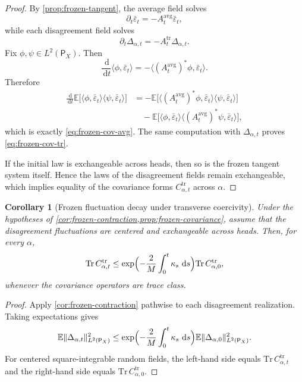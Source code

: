 \documentclass[11pt]{article}
\newtheorem{corollary}[theorem]{Corollary}
\theoremstyle{definition}
\newcommand{\E}{\mathbb{E}}
\newcommand{\dd}{\,\mathrm{d}}
\begin{document}
\begin{proof}
By \cref{prop:frozen-tangent}, the average field solves
\[
  \partial_t \bar\varepsilon_t = -A_t^{\mathrm{avg}}\bar\varepsilon_t,
\]
while each disagreement field solves
\[
  \partial_t \Delta_{\alpha,t} = -A_t^{\mathrm{tr}}\Delta_{\alpha,t}.
\]
Fix $\phi,\psi\in L^2(\mathsf P_X)$.
Then
\[
  \frac{\dd}{\dd t}\langle \phi,\bar\varepsilon_t\rangle
  =
  -\langle (A_t^{\mathrm{avg}})^*\phi,\bar\varepsilon_t\rangle.
\]
Therefore
\begin{align*}
  \frac{\dd}{\dd t}
  \E\bigl[\langle \phi,\bar\varepsilon_t\rangle \langle \psi,\bar\varepsilon_t\rangle\bigr]
  &=
  -\E\bigl[\langle (A_t^{\mathrm{avg}})^*\phi,\bar\varepsilon_t\rangle \langle \psi,\bar\varepsilon_t\rangle\bigr]
  \\
  &\quad
  -
  \E\bigl[\langle \phi,\bar\varepsilon_t\rangle \langle (A_t^{\mathrm{avg}})^*\psi,\bar\varepsilon_t\rangle\bigr],
\end{align*}
which is exactly \eqref{eq:frozen-cov-avg}.
The same computation with $\Delta_{\alpha,t}$ proves \eqref{eq:frozen-cov-tr}.

If the initial law is exchangeable across heads, then so is the frozen tangent system itself.
Hence the laws of the disagreement fields remain exchangeable, which implies equality of the covariance forms $C_{\alpha,t}^{\mathrm{tr}}$ across $\alpha$.
\end{proof}

\begin{corollary}[Frozen fluctuation decay under transverse coercivity]
\label{cor:frozen-fluctuation-decay}
Under the hypotheses of \cref{cor:frozen-contraction,prop:frozen-covariance},
assume that the disagreement fluctuations are centered and exchangeable across heads.
Then, for every $\alpha$,
\begin{equation}
  \mathrm{Tr}\, C_{\alpha,t}^{\mathrm{tr}}
  \le
  \exp\Bigl(
    -\frac{2}{M}\int_0^t \kappa_s\,\dd s
  \Bigr)
  \mathrm{Tr}\, C_{\alpha,0}^{\mathrm{tr}},
  \label{eq:frozen-fluctuation-trace}
\end{equation}
whenever the covariance operators are trace class.
\end{corollary}

\begin{proof}
Apply \cref{cor:frozen-contraction} pathwise to each disagreement realization.
Taking expectations gives
\[
  \E\|\Delta_{\alpha,t}\|_{L^2(\mathsf P_X)}^2
  \le
  \exp\Bigl(
    -\frac{2}{M}\int_0^t \kappa_s\,\dd s
  \Bigr)
  \E\|\Delta_{\alpha,0}\|_{L^2(\mathsf P_X)}^2.
\]
For centered square-integrable random fields, the left-hand side equals $\mathrm{Tr}\, C_{\alpha,t}^{\mathrm{tr}}$ and the right-hand side equals $\mathrm{Tr}\, C_{\alpha,0}^{\mathrm{tr}}$.
\end{proof}
\end{document}
